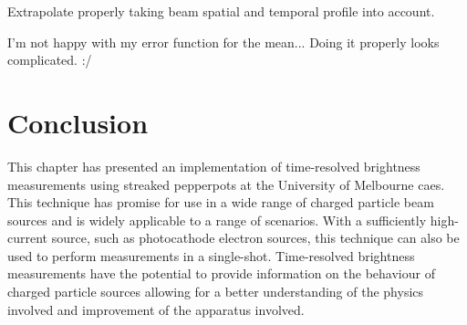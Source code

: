 {\color{red}Extrapolate properly taking beam spatial and temporal profile into account.}


{\color{red}I'm not happy with my error function for the mean... Doing it properly looks complicated. :/}

\section{Conclusion}
This chapter has presented an implementation of time-resolved brightness measurements using streaked pepperpots at the University of Melbourne \gls{caes}.
This technique has promise for use in a wide range of charged particle beam sources and is widely applicable to a range of scenarios.
With a sufficiently high-current source, such as photocathode electron sources, this technique can also be used to perform measurements in a single-shot.
Time-resolved brightness measurements have the potential to provide information on the behaviour of charged particle sources allowing for a better understanding of the physics involved and improvement of the apparatus involved.
